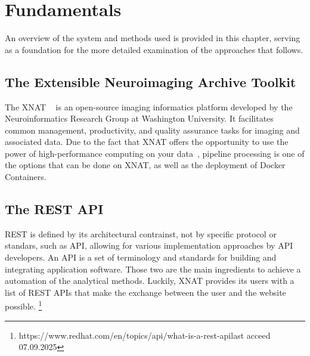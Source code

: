 
\chapter{Fundamentals}

An overview of the system and methods used is provided in this chapter, serving as a foundation for the more detailed examination of the approaches that follows. 

\section{The Extensible Neuroimaging Archive Toolkit}
The \ac{XNAT} ~\cite{marcus_extensible_2007} is an open-source imaging informatics platform developed by the Neuroinformatics Research Group at Washington University. It facilitates common management, productivity, and quality assurance tasks for imaging and associated data. Due to the fact that XNAT offers the opportunity to use the power of high-performance computing on your data~\cite{zaschke_extending_2024}, 
pipeline processing is one of the options that can be done on XNAT, as well as the deployment of Docker Containers.


\section{The \ac{REST API}}
REST is defined by its architectural contrainst, not by specific protocol or standars, such as API, allowing for various implementation approaches by API developers.
An API is a set of terminology and standards for building and integrating application software. Those two are the main ingredients to achieve a automation of the analytical methods.  Luckily, XNAT provides its users with a list of REST APIs that make the exchange between the user and the website possible. 
 \footnote{https://www.redhat.com/en/topics/api/what-is-a-rest-api{last acceed 07.09.2025}}

